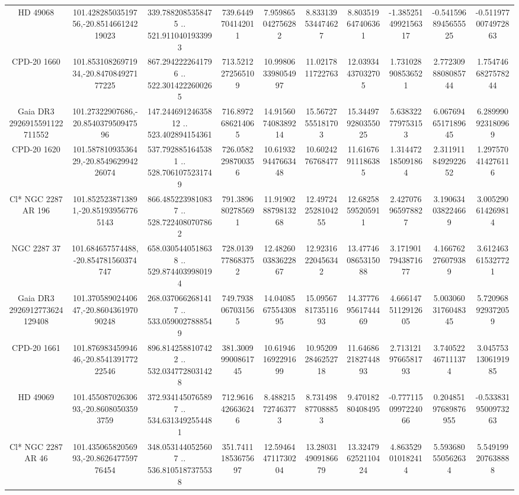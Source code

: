 \begin{table}
\begin{tabular}{cccccccccc}
HD  49068 & 101.42828503519756,-20.851466124219023 & 339.7882085358475 .. 521.9110401933993 & 739.6449704142011 & 7.959865042756282 & 8.833139534474627 & 8.803519647406361 & -1.3852514992156317 & -0.5415968945655525 & -0.5119770074972863 \\
CPD-20  1660 & 101.85310826971934,-20.847084927177225 & 867.2942222641796 .. 522.3014222600265 & 713.5212272565109 & 10.998063398054997 & 11.0217811722763 & 12.03934437032705 & 1.731028908536521 & 2.7723098808085744 & 1.7547466827578244 \\
Gaia DR3 2926915591122711552 & 101.27322907686,-20.854037950947596 & 147.24469124635812 .. 523.402894154361 & 716.8972686214065 & 14.915607408389214 & 15.56727555181703 & 15.344979280355025 & 5.638322779753153 & 6.0676946517189645 & 6.289990923180969 \\
CPD-20  1620 & 101.58781093536429,-20.854962994226074 & 537.7928851645381 .. 528.7061075231749 & 726.0582298700356 & 10.619329447663448 & 10.6024276768477 & 11.61676911186385 & 1.314472185091864 & 2.3119118492922652 & 1.297570414276116 \\
Cl* NGC 2287     AR     196 & 101.8525238713891,-20.851939567765143 & 866.4852239810837 .. 528.7224080707862 & 791.3896802785691 & 11.919028879813268 & 12.497242528104255 & 12.68258595205911 & 2.427076965978827 & 3.190634038224669 & 3.005290614269814 \\
NGC  2287    37 & 101.684657574488,-20.854781560374747 & 658.0305440518638 .. 529.8744039980194 & 728.0139778683752 & 12.482600383622867 & 12.92316220456342 & 13.477460865315088 & 3.1719017943871677 & 4.166762276079389 & 3.612463615327721 \\
Gaia DR3 2926912773624129408 & 101.37058902440647,-20.860436197090248 & 268.0370662681417 .. 533.0590027888549 & 749.7938067031565 & 14.040856755430895 & 15.095678173511693 & 14.377769561744469 & 4.6661475112912605 & 5.0030603176048345 & 5.720968929372059 \\
CPD-20  1661 & 101.87698345994646,-20.854139177222546 & 896.8142588107422 .. 532.0347728031428 & 381.30099900861745 & 10.619461692291699 & 10.952092846252718 & 11.646862182744893 & 2.7131219766581793 & 3.740522467111374 & 3.0457531306191985 \\
HD  49069 & 101.45508702630693,-20.86080503593759 & 372.9341450765897 .. 534.6313492554481 & 712.9616426636246 & 8.488215727463773 & 8.731498877088853 & 9.47018280408495 & -0.7771150997224066 & 0.20485197689876955 & -0.5338319500973263 \\
Cl* NGC 2287     AR      46 & 101.43506582056993,-20.862647759776454 & 348.0531440525607 .. 536.8105187375538 & 351.74111853675697 & 12.594644711730204 & 13.280314909186679 & 13.324796252110424 & 4.863529010182414 & 5.593680550562634 & 5.549199207638888 \\

\end{tabular}
\end{table}
